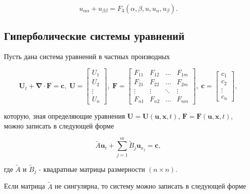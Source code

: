 			\begin{equation}
				u_{\alpha \alpha} + u_{\beta \beta} = F_{3} \left( \alpha, \beta, u, u_{\alpha}, u_{\beta} \right).
			\end{equation}

		\newpage

	\subsection*{Гиперболические системы уравнений}

		Пусть дана система уравнений в частных производных

		\begin{equation}
			\mathbf{U}_{t} + \mathbf{\nabla} \cdot \mathbf{F} = \mathbf{c}, \;
			\mathbf{U} =
			\begin{bmatrix}
				U_{1} \\
				U_{2} \\
				\vdots \\
				U_{n}
			\end{bmatrix}, \;
			\mathbf{F} =
			\begin{bmatrix}
				F_{11} & F_{12} & \ldots & F_{1m} \\
				F_{21} & F_{22} & \ldots & F_{2m} \\
				\vdots & \vdots & \ddots & \vdots \\
				F_{n1} & F_{n2} & \ldots & F_{nm}
			\end{bmatrix}, \;
            \mathbf{c} =
			\begin{bmatrix}
				c_{1} \\
				c_{2} \\
				\vdots \\
				c_{n}
			\end{bmatrix},
		\end{equation}

		которую, зная определяющие уравнения $\mathbf{U} = \mathbf{U} \left( \mathbf{u}, \mathbf{x}, t \right)$, $\mathbf{F} = \mathbf{F} \left( \mathbf{u}, \mathbf{x}, t \right)$, можно записать в следующей форме

		\begin{equation}
			\tilde{A} \mathbf{u}_{t} + \sum_{j = 1}^{m} \tilde{B}_{j} \mathbf{u}_{x_{j}} = \mathbf{c},
		\end{equation}

		где $\tilde{A}$ и $\tilde{B}_{j}$ - квадратные матрицы размерности $(n \times n)$.

		Если матрица $\tilde{A}$ не сингулярна, то систему можно записать в следующей форме

